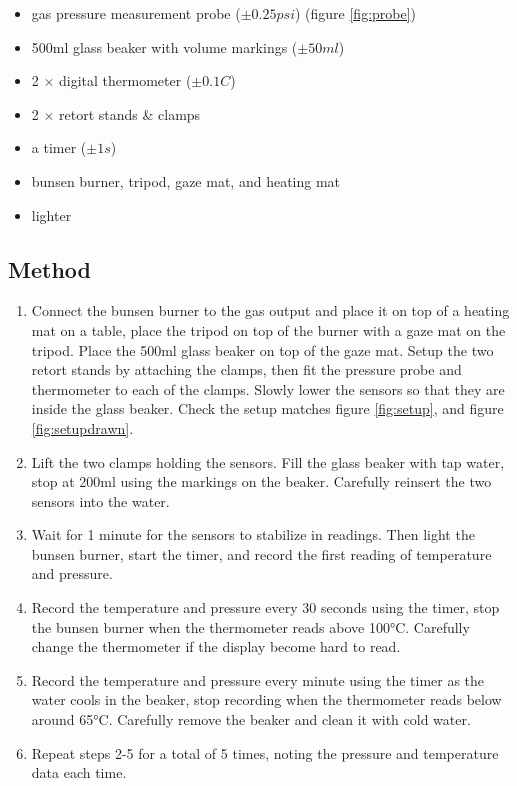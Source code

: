 \documentclass[a4paper,12pt]{article}
\begin{document}
\begin{itemize}
    \item gas pressure measurement probe ($\pm 0.25\si{psi}$) (figure \ref{fig:probe})
    \item 500ml glass beaker with volume markings ($\pm 50\si{ml}$)
    \item 2 $\times$ digital thermometer ($\pm 0.1\si{C}$)
    \item 2 $\times$ retort stands \& clamps
    \item a timer ($\pm 1\si{s}$)
    \item bunsen burner, tripod, gaze mat, and heating mat
    \item lighter
\end{itemize}


\newpage
\subsection{Method}


\begin{enumerate}
    \item Connect the bunsen burner to the gas output and place it on top of a heating mat on a table, place the tripod on top of the burner with a gaze mat on the tripod. Place the 500ml glass beaker on top of the gaze mat. Setup the two retort stands by attaching the clamps, then fit the pressure probe and thermometer to each of the clamps. Slowly lower the sensors so that they are inside the glass beaker. Check the setup matches figure \ref{fig:setup}, and figure \ref{fig:setupdrawn}.
    \item Lift the two clamps holding the sensors. Fill the glass beaker with tap water, stop at 200ml using the markings on the beaker. Carefully reinsert the two sensors into the water.
    \item Wait for 1 minute for the sensors to stabilize in readings. Then light the bunsen burner, start the timer, and record the first reading of temperature and pressure.
    \item Record the temperature and pressure every 30 seconds using the timer, stop the bunsen burner when the thermometer reads above 100$\si{\celsius}$. Carefully change the thermometer if the display become hard to read.
    \item Record the temperature and pressure every minute using the timer as the water cools in the beaker, stop recording when the thermometer reads below around 65$\si{\celsius}$. Carefully remove the beaker and clean it with cold water.
    \item Repeat steps 2-5 for a total of 5 times, noting the pressure and temperature data each time.
\end{enumerate}
\end{document}
